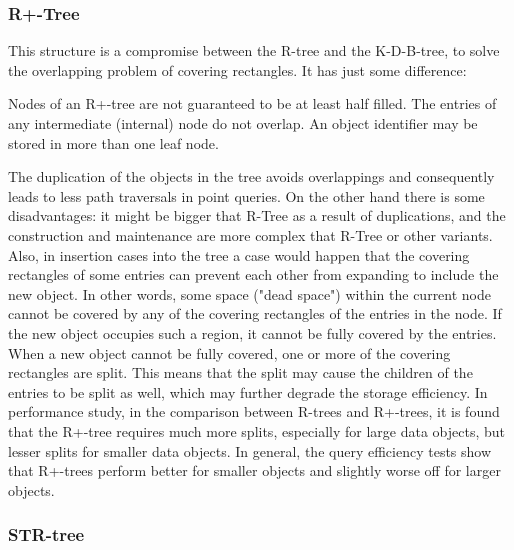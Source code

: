 \documentclass[a4paper,12pt]{article}
\begin{document}
\subsubsection{R+-Tree}

This structure is a compromise between the R-tree and the K-D-B-tree, to solve the overlapping problem of covering rectangles. It has just some difference:

Nodes of an R+-tree are not guaranteed to be at least half filled.
 The entries of any intermediate (internal) node do not overlap.
 An object identifier may be stored in more than one leaf node.

The duplication of the objects in the tree avoids overlappings and consequently leads to less path traversals in point queries. 
On the other hand there is some disadvantages: it might be bigger that R-Tree as a result of duplications, and the construction and maintenance are more complex that R-Tree or other variants. 
Also, in insertion cases into the tree a case would happen that the	covering rectangles of some entries can prevent each other from expanding to include the new object. In other words, some space ("dead space") within the current node cannot be covered by any of the covering rectangles of the entries in the node. If the new object occupies such a region, it cannot be fully covered by the entries. When a new object cannot be fully covered, one or more of the covering rectangles are split. This means that the split may cause the children of the entries to be split as well, which may further degrade the storage efficiency.
In performance study, in the comparison between R-trees and R+-trees, it is found that the R+-tree requires much more splits, especially for large data objects, but lesser splits for smaller data objects. 
In general, the query efficiency tests show that R+-trees perform better for smaller objects and slightly worse off for larger objects.

\subsubsection{STR-tree}
\end{document}

